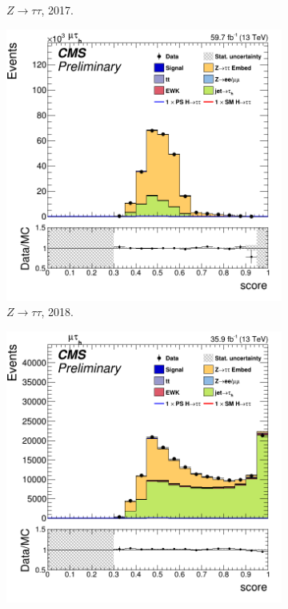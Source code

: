 \begin{figure}[!ht]
\begin{subfigure}[b]{0.33\linewidth}
    \caption{$Z\to\tau\tau$, 2017.} 
    \vspace{0.5cm}
  \end{subfigure} 
    \begin{subfigure}[b]{0.33\linewidth}
    \centering
    \includegraphics[width=\linewidth]{Chapitre7/Images/CtrlPlots/2018/BDTscoreZTT.png} 
    \caption{$Z\to\tau\tau$, 2018.} 
    \vspace{0.5cm}
  \end{subfigure} 
  \begin{subfigure}[b]{0.33\linewidth}
    \centering
    \includegraphics[width=\linewidth]{Chapitre7/Images/CtrlPlots/2016/BDTscoreJetFakes.png} 

\end{subfigure}
\end{figure}
